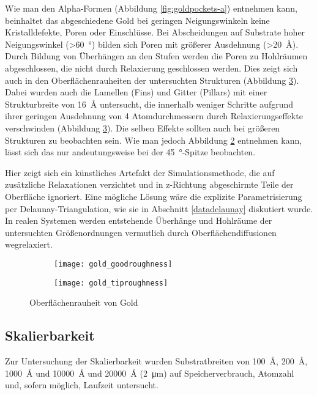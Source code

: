 Wie man den Alpha-Formen (Abbildung \ref{fig:goldpockets-a}) entnehmen kann, beinhaltet das abgeschiedene Gold bei geringen Neigungswinkeln keine Kristalldefekte, Poren oder Einschlüsse.
Bei Abscheidungen auf Substrate hoher Neigungswinkel (>\SI{60}{\degree}) bilden sich Poren mit größerer Ausdehnung (>\SI{20}{\angstrom}).
Durch Bildung von Überhängen an den Stufen werden die Poren zu Hohlräumen abgeschlossen, die nicht durch Relaxierung geschlossen werden.
Dies zeigt sich auch in den Oberflächenrauheiten der untersuchten Strukturen (Abbildung \ref{fig:goldroughness}).
Dabei wurden auch die Lamellen (Fins) und Gitter (Pillars) mit einer Strukturbreite von \SI{16}{\angstrom} untersucht, die innerhalb weniger Schritte aufgrund ihrer geringen Ausdehnung von \num{4} Atomdurchmessern durch Relaxierungseffekte verschwinden (Abbildung \ref{fig:goldroughness}).
Die selben Effekte sollten auch bei größeren Strukturen zu beobachten sein.
Wie man jedoch Abbildung \ref{fig:goldroughness-b} entnehmen kann, lässt sich das nur andeutungsweise bei der \SI{45}{\degree}-Spitze beobachten.

Hier zeigt sich ein künstliches Artefakt der Simulationsmethode, die auf zusätzliche Relaxationen verzichtet und in z-Richtung abgeschirmte Teile der Oberfläche ignoriert.
Eine mögliche Lösung wäre die explizite Parametrisierung per Delaunay-Triangulation, wie sie in Abschnitt \ref{datadelaunay} diskutiert wurde.
In realen Systemen werden entstehende Überhänge und Hohlräume der untersuchten Größenordnungen vermutlich durch Oberflächendiffusionen wegrelaxiert.

\begin{figure}[h]
  \captionsetup[subfigure]{singlelinecheck=false}
  \def\subfigwidth{0.49\textwidth}

  \begin{subfigure}[t]{\subfigwidth}
    \texttt{[image: gold\_goodroughness]}
    \label{fig:goldroughness-a}
  \end{subfigure}
  \hfill
  \begin{subfigure}[t]{\subfigwidth}
    \texttt{[image: gold\_tiproughness]}
    \label{fig:goldroughness-b}
  \end{subfigure}

  \caption[Oberflächenrauheit von Gold]{Oberflächenrauheit von Gold}
  \label{fig:goldroughness}

\end{figure}

\subsection{Skalierbarkeit}

Zur Untersuchung der Skalierbarkeit wurden Substratbreiten von \SI{100}{\angstrom}, \SI{200}{\angstrom}, \SI{1000}{\angstrom} und \SI{10000}{\angstrom} und \SI{20000}{\angstrom} (\SI{2}{\micro\meter}) auf Speicherverbrauch, Atomzahl und, sofern möglich, Laufzeit untersucht.
